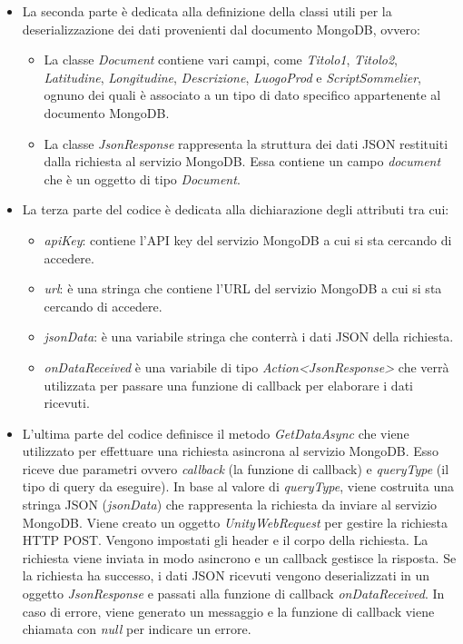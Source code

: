\begin{itemize}
	\item La seconda parte è dedicata alla definizione della classi utili per la deserializzazione dei dati provenienti dal documento MongoDB, ovvero:
	\begin{itemize}
		\item La classe \textit{Document} contiene vari campi, come \textit{Titolo1}, \textit{Titolo2}, \textit{Latitudine}, \textit{Longitudine}, \textit{Descrizione}, \textit{LuogoProd} e \textit{ScriptSommelier}, ognuno dei quali è associato a un tipo di dato specifico appartenente al documento MongoDB.
		\item La classe \textit{JsonResponse} rappresenta la struttura dei dati JSON restituiti dalla richiesta al servizio MongoDB. Essa contiene un campo \textit{document} che è un oggetto di tipo \textit{Document}.
	\end{itemize}
	\item La terza parte del codice è dedicata alla dichiarazione degli attributi tra cui:
	\begin{itemize}
		\item \textit{apiKey}: contiene l'API key del servizio MongoDB a cui si sta cercando di accedere.
		\item \textit{url}: è una stringa che contiene l'URL del servizio MongoDB a cui si sta cercando di accedere.
		\item \textit{jsonData}: è una variabile stringa che conterrà i dati JSON della richiesta.
		\item \textit{onDataReceived} è una variabile di tipo \textit{Action<JsonResponse>} che verrà utilizzata per passare una funzione di callback per elaborare i dati ricevuti.
	\end{itemize}
	\item L'ultima parte del codice definisce il metodo \textit{GetDataAsync} che viene utilizzato per effettuare una richiesta asincrona al servizio MongoDB.
Esso riceve due parametri ovvero \textit{callback} (la funzione di callback) e \textit{queryType} (il tipo di query da eseguire).
In base al valore di \textit{queryType}, viene costruita una stringa JSON (\textit{jsonData}) che rappresenta la richiesta da inviare al servizio MongoDB.
Viene creato un oggetto \textit{UnityWebRequest} per gestire la richiesta HTTP POST. Vengono impostati gli header e il corpo della richiesta.
La richiesta viene inviata in modo asincrono e un callback gestisce la risposta.
Se la richiesta ha successo, i dati JSON ricevuti vengono deserializzati in un oggetto \textit{JsonResponse} e passati alla funzione di callback \textit{onDataReceived}.
In caso di errore, viene generato un messaggio e la funzione di callback viene chiamata con \textit{null} per indicare un errore.
	
\end{itemize}


